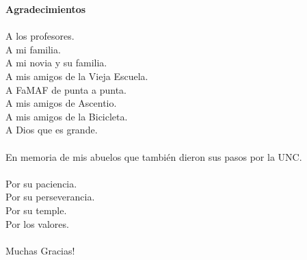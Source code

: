 {\huge \textbf{Agradecimientos}}\\
\\
A los profesores.\\
A mi familia.\\
A mi novia y su familia.\\
A mis amigos de la Vieja Escuela.\\
A FaMAF de punta a punta.\\
A mis amigos de Ascentio.\\
A mis amigos de la Bicicleta.\\ 
A Dios que es grande.\\
\\
En memoria de mis abuelos que tambi\'en dieron sus pasos por la UNC.\\\\
\noindent
Por su paciencia.\\
Por su perseverancia.\\
Por su temple.\\
Por los valores.\\
\\
Muchas Gracias!


\newpage
